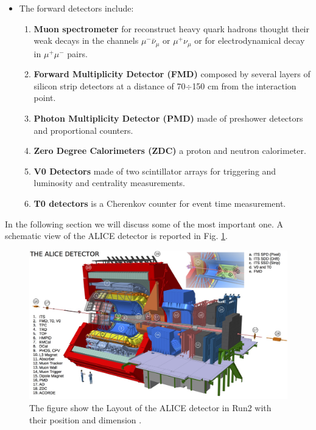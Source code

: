 \documentclass[12pt,a4paper]{book}
\begin{document}
\begin{itemize}
\begin{enumerate}
		\end{enumerate}
		\item 	The forward detectors include:
		\begin{enumerate}
			\item \textbf{Muon spectrometer} for reconstruct heavy quark hadrons thought their weak decays in the channels $\mu^- \bar{\nu}_\mu$ or $\mu^+ \nu_\mu$  or for electrodynamical decay in $\mu^+ \mu^-$ pairs.
			\item \textbf{Forward Multiplicity Detector (FMD)} composed by several layers of silicon strip detectors at a distance of 70$\div$150 cm from the interaction point.
			\item \textbf{Photon Multiplicity Detector (PMD)} made of preshower detectors and proportional counters.
			\item \textbf{Zero Degree Calorimeters (ZDC)} a proton and neutron calorimeter.
			\item \textbf{V0 Detectors} made of two scintillator arrays for triggering and luminosity and centrality measurements.
			\item \textbf{T0 detectors} is a Cherenkov counter for event time measurement.
		\end{enumerate}
	\end{itemize}
	
	In the following section we will discuss some of the most important one. A schematic view of the ALICE detector is reported in Fig. \ref{fig:ALICE_instruments}.
	\begin{figure}[h]
		\centering
		\includegraphics[width=1\textwidth]{pictures/ALICE_instruments.png}
		\caption{The figure show the Layout of the ALICE detector in Run2 with their position and dimension \cite{Botta:2017bwj}.}
		\label{fig:ALICE_instruments}
	\end{figure}
	
\end{document}
